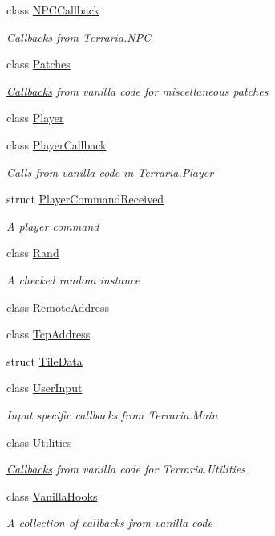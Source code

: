 \begin{DoxyCompactItemize}
class \hyperlink{classOTA_1_1Callbacks_1_1NPCCallback}{N\+P\+C\+Callback}
\begin{DoxyCompactList}\small\item\em \hyperlink{namespaceOTA_1_1Callbacks}{Callbacks} from Terraria.\+N\+P\+C \end{DoxyCompactList}\item 
class \hyperlink{classOTA_1_1Callbacks_1_1Patches}{Patches}
\begin{DoxyCompactList}\small\item\em \hyperlink{namespaceOTA_1_1Callbacks}{Callbacks} from vanilla code for miscellaneous patches \end{DoxyCompactList}\item 
class \hyperlink{classOTA_1_1Callbacks_1_1Player}{Player}
\item 
class \hyperlink{classOTA_1_1Callbacks_1_1PlayerCallback}{Player\+Callback}
\begin{DoxyCompactList}\small\item\em Calls from vanilla code in Terraria.\+Player \end{DoxyCompactList}\item 
struct \hyperlink{structOTA_1_1Callbacks_1_1PlayerCommandReceived}{Player\+Command\+Received}
\begin{DoxyCompactList}\small\item\em A player command \end{DoxyCompactList}\item 
class \hyperlink{classOTA_1_1Callbacks_1_1Rand}{Rand}
\begin{DoxyCompactList}\small\item\em A checked random instance \end{DoxyCompactList}\item 
class \hyperlink{classOTA_1_1Callbacks_1_1RemoteAddress}{Remote\+Address}
\item 
class \hyperlink{classOTA_1_1Callbacks_1_1TcpAddress}{Tcp\+Address}
\item 
struct \hyperlink{structOTA_1_1Callbacks_1_1TileData}{Tile\+Data}
\item 
class \hyperlink{classOTA_1_1Callbacks_1_1UserInput}{User\+Input}
\begin{DoxyCompactList}\small\item\em Input specific callbacks from Terraria.\+Main \end{DoxyCompactList}\item 
class \hyperlink{classOTA_1_1Callbacks_1_1Utilities}{Utilities}
\begin{DoxyCompactList}\small\item\em \hyperlink{namespaceOTA_1_1Callbacks}{Callbacks} from vanilla code for Terraria.\+Utilities \end{DoxyCompactList}\item 
class \hyperlink{classOTA_1_1Callbacks_1_1VanillaHooks}{Vanilla\+Hooks}
\begin{DoxyCompactList}\small\item\em A collection of callbacks from vanilla code \end{DoxyCompactList}\end{DoxyCompactItemize}
